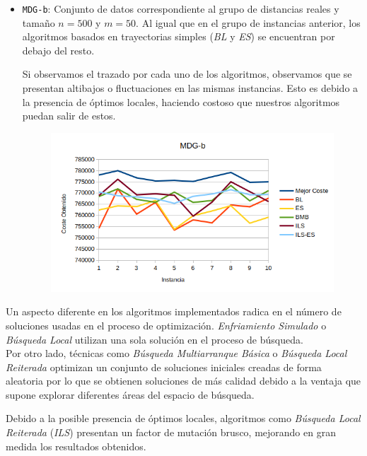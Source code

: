 \begin{itemize}
	
	
	\item \texttt{MDG-b}: Conjunto de datos correspondiente al grupo de distancias reales y tamaño $n=500$ y $m=50$. 
	Al igual que en el grupo de instancias anterior, los algoritmos basados en trayectorias simples (\textit{BL} y \textit{ES}) se encuentran por debajo del resto.
	
	Si observamos el trazado por cada uno de los algoritmos, observamos que se presentan altibajos o fluctuaciones en las mismas instancias. Esto es debido a la presencia de óptimos locales, haciendo costoso que nuestros algoritmos puedan salir de estos. 
	
	

	\begin{figure}[H]
		\centering
		\includegraphics[scale=0.62]{img/mdgb.png}
	\end{figure}
	
\end{itemize}

\newpage

Un aspecto diferente en los algoritmos implementados radica en el número de soluciones usadas en el proceso de optimización. \textit{Enfriamiento Simulado} o \textit{Búsqueda Local} utilizan una sola solución en el proceso de búsqueda. \\



Por otro lado, técnicas como \textit{Búsqueda Multiarranque Básica} o \textit{Búsqueda Local Reiterada} optimizan un conjunto de soluciones iniciales creadas de forma aleatoria por lo que se obtienen soluciones de más calidad debido a la ventaja que supone explorar diferentes áreas del espacio de búsqueda.

Debido a la posible presencia de óptimos locales, algoritmos como \textit{Búsqueda Local Reiterada} (\textit{ILS}) presentan un factor de mutación brusco, mejorando en gran medida los resultados obtenidos.







